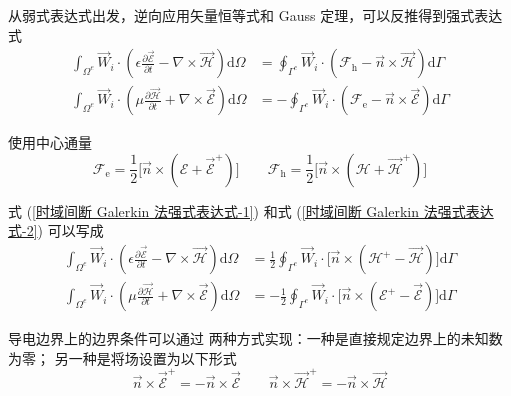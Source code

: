 \par 从弱式表达式出发，逆向应用矢量恒等式和 Gauss 定理，可以反推得到强式表达式
\begin{align}
    \label{时域间断 Galerkin 法强式表达式-1}
    \int_{\Omega^e}\vec{W}_i\cdot\left(
        \epsilon\frac{\partial\vec{\mathscr{E}}}{\partial t}
        -\nabla\times\vec{\mathscr{H}}
    \right)\text{d}\Omega
    &=\oint_{\Gamma^e}\vec{W}_i\cdot
    (\mathscr{F}_{\text{h}}-\vec{n}\times\vec{\mathscr{H}})\text{d}\Gamma\\
    \label{时域间断 Galerkin 法强式表达式-2}
    \int_{\Omega^e}\vec{W}_i\cdot\left(
        \mu\frac{\partial\vec{\mathscr{H}}}{\partial t}
        +\nabla\times\vec{\mathscr{E}}
    \right)\text{d}\Omega
    &=-\oint_{\Gamma^e}\vec{W}_i\cdot
    (\mathscr{F}_{\text{e}}-\vec{n}\times\vec{\mathscr{E}})\text{d}\Gamma
\end{align}
\par 使用中心通量
\begin{equation}
    \mathscr{F}_{\text{e}}=\frac{1}{2}
    \Big[\vec{n}\times(\mathscr{E}+\vec{\mathscr{E}}^+)\Big]
    \qquad
    \mathscr{F}_{\text{h}}=\frac{1}{2}
    \Big[\vec{n}\times(\mathscr{H}+\vec{\mathscr{H}}^+)\Big]
\end{equation}
\par 式 (\ref{时域间断 Galerkin 法强式表达式-1}) 和式 (\ref{时域间断 Galerkin 法强式表达式-2})
可以写成
\begin{align}
    \label{中心通量时域间断 Galerkin 法-1}
    \int_{\Omega^e}\vec{W}_i\cdot\left(
        \epsilon\frac{\partial\vec{\mathscr{E}}}{\partial t}
        -\nabla\times\vec{\mathscr{H}}
    \right)\text{d}\Omega
    &=\frac{1}{2}\oint_{\Gamma^e}\vec{W}_i\cdot
    \Big[\vec{n}\times(\mathscr{H}^+-\vec{\mathscr{H}})\Big]
    \text{d}\Gamma\\
    \label{中心通量时域间断 Galerkin 法-2}
    \int_{\Omega^e}\vec{W}_i\cdot\left(
        \mu\frac{\partial\vec{\mathscr{H}}}{\partial t}
        +\nabla\times\vec{\mathscr{E}}
    \right)\text{d}\Omega
    &=-\frac{1}{2}\oint_{\Gamma^e}\vec{W}_i\cdot
    \Big[\vec{n}\times(\mathscr{E}^+-\vec{\mathscr{E}})\Big]
    \text{d}\Gamma
\end{align}
\par 导电边界上的边界条件可以通过
两种方式实现：一种是直接规定边界上的未知数为零；
另一种是将场设置为以下形式
\begin{equation}
    \vec{n}\times\vec{\mathscr{E}}^+=
    -\vec{n}\times\vec{\mathscr{E}}
    \qquad
    \vec{n}\times\vec{\mathscr{H}}^+=
    -\vec{n}\times\vec{\mathscr{H}}
\end{equation}
